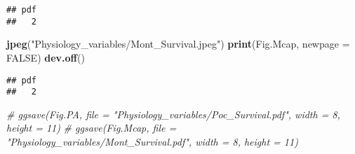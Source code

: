 \documentclass[]{article}
\newenvironment{Shaded}{\begin{snugshade}}{\end{snugshade}}
\newcommand{\KeywordTok}[1]{\textcolor[rgb]{0.13,0.29,0.53}{\textbf{#1}}}
\newcommand{\DataTypeTok}[1]{\textcolor[rgb]{0.13,0.29,0.53}{#1}}
\newcommand{\StringTok}[1]{\textcolor[rgb]{0.31,0.60,0.02}{#1}}
\newcommand{\CommentTok}[1]{\textcolor[rgb]{0.56,0.35,0.01}{\textit{#1}}}
\newcommand{\OtherTok}[1]{\textcolor[rgb]{0.56,0.35,0.01}{#1}}
\newcommand{\NormalTok}[1]{#1}
\begin{document}
\begin{verbatim}
## pdf 
##   2
\end{verbatim}

\begin{Shaded}
\begin{Highlighting}[]
\KeywordTok{jpeg}\NormalTok{(}\StringTok{"Physiology_variables/Mont_Survival.jpeg"}\NormalTok{)}
\KeywordTok{print}\NormalTok{(Fig.Mcap, }\DataTypeTok{newpage =} \OtherTok{FALSE}\NormalTok{)}
\KeywordTok{dev.off}\NormalTok{()}
\end{Highlighting}
\end{Shaded}

\begin{verbatim}
## pdf 
##   2
\end{verbatim}

\begin{Shaded}
\begin{Highlighting}[]
\CommentTok{# ggsave(Fig.PA, file = "Physiology_variables/Poc_Survival.pdf", width = 8, height = 11)}
\CommentTok{# ggsave(Fig.Mcap, file = "Physiology_variables/Mont_Survival.pdf", width = 8, height = 11)}
\end{Highlighting}
\end{Shaded}
\end{document}
